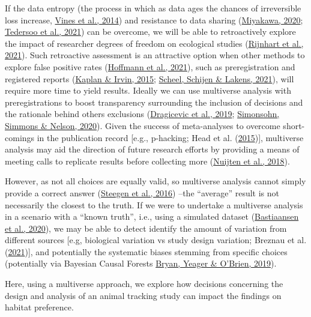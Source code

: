 \documentclass[10pt,a4paper]{article}
\begin{document}
If the data entropy (the process in which as data ages the chances of irreversible loss increase, \protect\hyperlink{ref-vines_availability_2014}{Vines et al., 2014}) and resistance to data sharing (\protect\hyperlink{ref-miyakawa_no_2020}{Miyakawa, 2020}; \protect\hyperlink{ref-tedersoo_data_2021}{Tedersoo et al., 2021}) can be overcome, we will be able to retroactively explore the impact of researcher degrees of freedom on ecological studies (\protect\hyperlink{ref-rijnhart_assessing_2021}{Rijnhart et al., 2021}).
Such retroactive assessment is an attractive option when other methods to explore false positive rates (\protect\hyperlink{ref-hoffmann_multiplicity_2021}{Hoffmann et al., 2021}), such as preregistration and registered reports (\protect\hyperlink{ref-kaplan_likelihood_2015}{Kaplan \& Irvin, 2015}; \protect\hyperlink{ref-scheel_excess_2021}{Scheel, Schijen \& Lakens, 2021}), will require more time to yield results.
Ideally we can use multiverse analysis with preregistrations to boost transparency surrounding the inclusion of decisions and the rationale behind others exclusions (\protect\hyperlink{ref-dragicevic_increasing_2019}{Dragicevic et al., 2019}; \protect\hyperlink{ref-simonsohn_specification_2020}{Simonsohn, Simmons \& Nelson, 2020}).
Given the success of meta-analyses to overcome short-comings in the publication record {[}e.g., p-hacking; Head et al. (\protect\hyperlink{ref-head_extent_2015}{2015}){]}, multiverse analysis may aid the direction of future research efforts by providing a means of meeting calls to replicate results before collecting more (\protect\hyperlink{ref-nuijten_verify_2018}{Nuijten et al., 2018}).

However, as not all choices are equally valid, so multiverse analysis cannot simply provide a correct answer (\protect\hyperlink{ref-steegen_increasing_2016}{Steegen et al., 2016}) --the ``average'' result is not necessarily the closest to the truth.
If we were to undertake a multiverse analysis in a scenario with a ``known truth'', i.e., using a simulated dataset (\protect\hyperlink{ref-bastiaansen_time_2020}{Bastiaansen et al., 2020}), we may be able to detect identify the amount of variation from different sources {[}e.g, biological variation vs study design variation; Breznau et al. (\protect\hyperlink{ref-breznau_observing_2021}{2021}){]}, and potentially the systematic biases stemming from specific choices (potentially via Bayesian Causal Forests \protect\hyperlink{ref-bryan_replicator_2019}{Bryan, Yeager \& O'Brien, 2019}).

Here, using a multiverse approach, we explore how decisions concerning the design and analysis of an animal tracking study can impact the findings on habitat preference.
\end{document}
